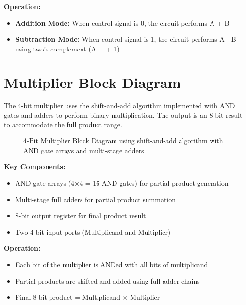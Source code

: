 \textbf{Operation:}
\begin{itemize}
    \item \textbf{Addition Mode:} When control signal is 0, the circuit performs A + B
    \item \textbf{Subtraction Mode:} When control signal is 1, the circuit performs A - B using two's complement (A +  + 1)
\end{itemize}

\section{Multiplier Block Diagram}

The 4-bit multiplier uses the shift-and-add algorithm implemented with AND gates and adders to perform binary multiplication. The output is an 8-bit result to accommodate the full product range.

\begin{figure}[h]
    \centering
    \caption{4-Bit Multiplier Block Diagram using shift-and-add algorithm with AND gate arrays and multi-stage adders}
    \label{fig:multiplier}
\end{figure}

\textbf{Key Components:}
\begin{itemize}
    \item AND gate arrays (4×4 = 16 AND gates) for partial product generation
    \item Multi-stage full adders for partial product summation
    \item 8-bit output register for final product result
    \item Two 4-bit input ports (Multiplicand and Multiplier)
\end{itemize}

\textbf{Operation:}
\begin{itemize}
    \item Each bit of the multiplier is ANDed with all bits of multiplicand
    \item Partial products are shifted and added using full adder chains
    \item Final 8-bit product = Multiplicand × Multiplier
\end{itemize}

